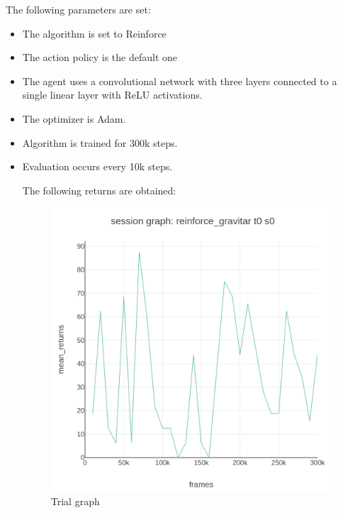 \documentclass[12pt,a4paper]{report}
\begin{document}
	The following parameters are set:
		\begin{itemize}
	\item The algorithm is set to Reinforce
	\item The action policy is the default one
	\item The agent uses a convolutional network with three layers connected to a single linear layer with ReLU activations.
	\item The optimizer is Adam.
	\item Algorithm is trained for 300k steps.
	\item Evaluation occurs every 10k steps.
	
	The following returns are obtained:
	
	\begin{figure}[ht!]
		\begin{minipage}[c]{0.5\linewidth}
			\centering
			\includegraphics[height=0.3\textheight, width=0.9\linewidth]{reinforce_gravitar_t0_s0_session_graph_eval_mean_returns_vs_frames.png}
			\caption{Trial graph}
		\end{minipage}\hfill
		\begin{minipage}[c]{0.5\linewidth}	
			\centering

\end{minipage}
\end{figure}
\end{itemize}
\end{document}
